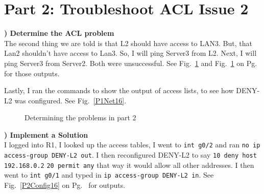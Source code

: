 \documentclass{report}
\newcommand{\mysection}[1]{\section*{#1}}
\newcommand{\mysubsection}[2]{\textbf{\romannumeral #1) #2}}
\begin{document}
\clearpage

\mysection{\textbf{Part 2: Troubleshoot ACL Issue 2}}


\mysubsection{1}{Determine the ACL problem}\\
The second thing we are told is that L2 should have access to LAN3. But, that 
Lan2 shouldn't have access to Lan3.  So, I will ping Server3 from L2. 
Next, I will ping Server3 from Server2. Both were unsuccessful. See Fig.~\ref{P2Net16} 
and Fig.~\ref{P2Net16}
on Pg.~\pageref{P2Net16} for those outputs.


Lastly, I ran the commands to show the output of access lists, 
to see how DENY-L2 was configured. See Fig.~\ref{P1Net16}.


\begin{figure}[!hbt]\centering
{}\hfill
{}\par 
{}
\caption{Determining the problems in part 2}\label{P2Net16}
\end{figure}

\noindent\mysubsection{2}{Implement a Solution}\\
I logged into R1, I looked up the access tables, I went to
{\scriptsize{\verb$int g0/2$}\normalsize} and ran
{\scriptsize{\verb$no ip access-group DENY-L2 out$}\normalsize}. I then
reconfigured DENY-L2 to say 
{\scriptsize{\verb$10 deny host 192.168.0.2$}\normalsize} 
{\scriptsize{\verb$20 permit any$}\normalsize} that way it would 
allow all other addresses.  I then went to 
{\scriptsize{\verb$int g0/1$}\normalsize} and typed
in {\scriptsize{\verb$ip access-group DENY-L2 in$}\normalsize}. See
Fig.~\ref{P2Config16} on Pg.~\pageref{P2Config16} for outputs.
\end{document}
